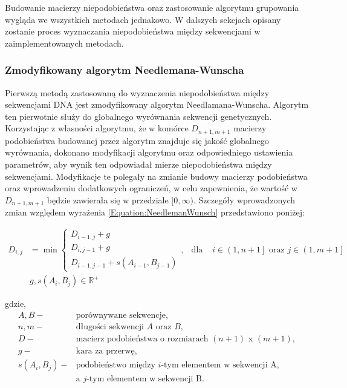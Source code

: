         Budowanie macierzy niepodobieństwa oraz zastosowanie algorytmu grupowania wygląda we wszystkich metodach jednakowo. W dalszych sekcjach opisany zostanie proces wyznaczania niepodobieństwa między sekwencjami w zaimplementowanych metodach.
        
        \subsubsection{Zmodyfikowany algorytm Needlemana-Wunscha}\label{Method:NeedlemanWunsch}

            Pierwszą metodą zastosowaną do wyznaczenia niepodobieństwa między sekwencjami DNA jest  zmodyfikowany algorytm Needlamana-Wunscha. Algorytm ten pierwotnie służy do globalnego wyrównania sekwencji genetycznych. Korzystając z własności algorytmu, że w komórce $D_{n+1, m+1}$ macierzy podobieństwa budowanej przez algorytm znajduje się jakość globalnego wyrównania, dokonano modyfikacji algorytmu oraz odpowiedniego ustawienia parametrów, aby wynik ten odpowiadał mierze niepodobieństwa między sekwencjami. Modyfikacje te polegały na zmianie budowy macierzy podobieństwa oraz wprowadzeniu dodatkowych ograniczeń, w celu zapewnienia, że wartość w $D_{n+1, m+1}$ będzie zawierała się w przedziale $[0, \infty)$. Szczegóły wprowadzonych zmian względem wyrażenia \eqref{Equation:NeedlemanWunsch} przedstawiono poniżej:

            \begin{equation}
                \begin{aligned}
                    D_{i,j} &= \min
                    \begin{cases}
                    D_{i - 1, j} + g \\
                    D_{i, j - 1} + g \\
                    D_{i - 1, j - 1} + s(A_{i - 1}, B_{j - 1})
                    \end{cases}, & \text{dla } & i \in \left(1, n + 1\right] \text{ oraz } j \in \left(1, m + 1\right] \\
                    & g, s(A_i, B_j) \in \mathbb{R}^{+}
                \end{aligned}
            \end{equation}

            gdzie,
            \begin{align*} 
                A, B -& \text{porównywane sekwencje}, \\
                n, m -& \text{długości sekwencji } A \text{ oraz } B, \\
                D -& \text{macierz podobieństwa o rozmiarach } (n + 1) \text{ x } (m + 1), \\
                g -& \text{kara za przerwę}, \\
                s(A_i, B_j) -& \text{podobieństwo między  } i\text{-tym elementem w sekwencji A,} \\ 
                & \text{a } j \text{-tym elementem w sekwencji B}. \\
            \end{align*}


